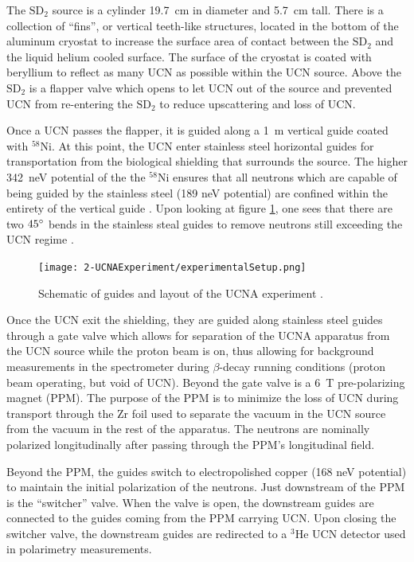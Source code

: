The $\mathrm{SD}_2$ source is a cylinder 19.7~cm in diameter and 5.7~cm tall. There
is a collection of ``fins'', or vertical teeth-like structures, located in
the bottom of the aluminum cryostat to increase the surface area of contact between the
$\mathrm{SD}_2$ and the liquid helium cooled surface. The surface of the cryostat
is coated with beryllium to reflect as many UCN as possible within the UCN source. Above
the $\mathrm{SD}_2$ is a flapper valve which opens to let UCN out of the source and
prevented UCN from re-entering the $\mathrm{SD}_2$ to reduce upscattering and loss of UCN.

Once a UCN passes the flapper, it is guided along a 1~m vertical guide coated with $^{58}\mathrm{Ni}$.
At this point, the UCN enter stainless steel horizontal guides for transportation from
the biological shielding that surrounds the source. The higher 342~neV potential of the
the $^{58}\mathrm{Ni}$ ensures that all neutrons which are capable of being guided by the
stainless steel (189 neV potential) are confined within the entirety of the vertical guide
\cite{saunders2013performance}. Upon looking at figure \ref{fig:guides}, one sees that
there are two $45\degree$ bends in the stainless steal guides to remove neutrons still
exceeding the UCN regime \cite{plaster2012}.

\begin{figure}[h]
  \centering
  \texttt{[image: 2-UCNAExperiment/experimentalSetup.png]} 
  \caption{Schematic of guides and layout of the UCNA experiment \cite{plaster2012}.}
  \label{fig:guides}
\end{figure}

Once the UCN exit the shielding, they are guided along stainless steel guides
through a gate valve which allows for separation of the UCNA apparatus from the UCN
source while the proton beam is on, thus allowing for background measurements in
the spectrometer
during $\beta$-decay running conditions (proton beam operating, but void of UCN).
Beyond the gate valve is a 6~T pre-polarizing magnet (PPM). The purpose of the PPM
is to minimize the loss of UCN during transport through the Zr foil used to separate
the vacuum in the UCN source from the vacuum in the rest of the apparatus. The neutrons
are nominally polarized longitudinally after passing through the PPM's longitudinal field.

Beyond the PPM, the guides switch to electropolished copper (168 neV potential) to
maintain the initial polarization of the neutrons. Just downstream of the PPM
is the ``switcher'' valve. When the valve is open, the downstream guides are connected
to the guides coming from the PPM carrying UCN. Upon closing the switcher valve,
the downstream guides are redirected to a $^3\mathrm{He}$ 
UCN detector \cite{morris2009multi} used in polarimetry measurements.

